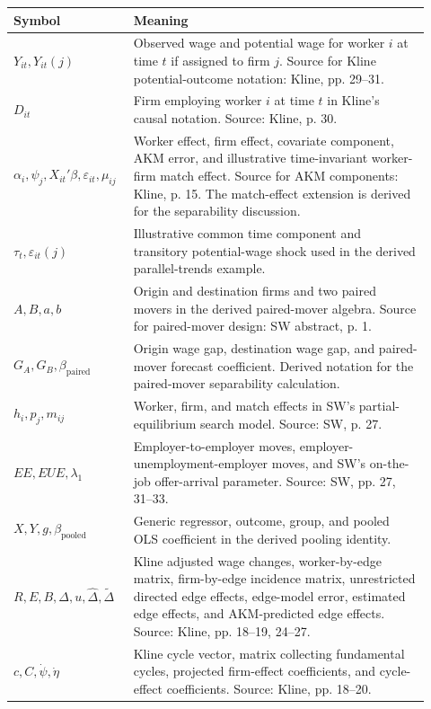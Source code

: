 \documentclass[11pt]{article}
\begin{document}
\begin{center}
\begin{tabular}{>{\raggedright\arraybackslash}p{0.24\linewidth}
                >{\raggedright\arraybackslash}p{0.68\linewidth}}
\toprule
Symbol & Meaning \\
\midrule
$Y_{it},Y_{it}(j)$ & Observed wage and potential wage for worker $i$ at time $t$ if assigned to firm $j$. Source for Kline potential-outcome notation: Kline, pp. 29--31. \\
$D_{it}$ & Firm employing worker $i$ at time $t$ in Kline's causal notation. Source: Kline, p. 30. \\
$\alpha_i,\psi_j,X_{it}'\beta,\varepsilon_{it},\mu_{ij}$ & Worker effect, firm effect, covariate component, AKM error, and illustrative time-invariant worker-firm match effect. Source for AKM components: Kline, p. 15. The match-effect extension is derived for the separability discussion. \\
$\tau_t,\varepsilon_{it}(j)$ & Illustrative common time component and transitory potential-wage shock used in the derived parallel-trends example. \\
$A,B,a,b$ & Origin and destination firms and two paired movers in the derived paired-mover algebra. Source for paired-mover design: SW abstract, p. 1. \\
$G_A,G_B,\beta_{\mathrm{paired}}$ & Origin wage gap, destination wage gap, and paired-mover forecast coefficient. Derived notation for the paired-mover separability calculation. \\
$h_i,p_j,m_{ij}$ & Worker, firm, and match effects in SW's partial-equilibrium search model. Source: SW, p. 27. \\
$EE,EUE,\lambda_1$ & Employer-to-employer moves, employer-unemployment-employer moves, and SW's on-the-job offer-arrival parameter. Source: SW, pp. 27, 31--33. \\
$X,Y,g,\beta_{\mathrm{pooled}}$ & Generic regressor, outcome, group, and pooled OLS coefficient in the derived pooling identity. \\
$R,E,B,\Delta,u,\hat\Delta,\tilde\Delta$ & Kline adjusted wage changes, worker-by-edge matrix, firm-by-edge incidence matrix, unrestricted directed edge effects, edge-model error, estimated edge effects, and AKM-predicted edge effects. Source: Kline, pp. 18--19, 24--27. \\
$c,C,\dot\psi,\dot\eta$ & Kline cycle vector, matrix collecting fundamental cycles, projected firm-effect coefficients, and cycle-effect coefficients. Source: Kline, pp. 18--20. \\

\end{tabular}
\end{center}
\end{document}
